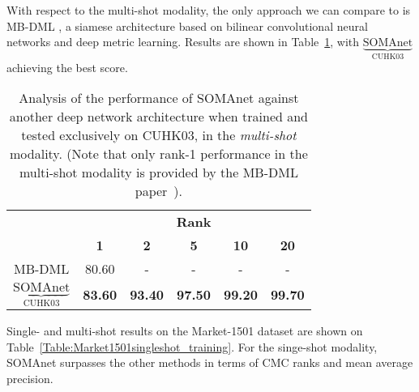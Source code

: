 \documentclass[10pt,journal,letterpaper,compsoc]{IEEEtran}
\newcommand{\ts}[2]{$\underbrace{\text{#1}}_\text{#2}$}
\begin{document}

With respect to the multi-shot modality, the only approach we can compare to is MB-DML \cite{mbdml,Lin_2015_ICCV}, a siamese architecture based on bilinear convolutional neural networks and deep metric learning. Results are shown in Table~\ref{Table:CUHK03multishot_training}, with \ts{SOMAnet}{CUHK03} achieving the best score.

\begin{table}[htbp]
\scriptsize
	\centering
	\caption{Analysis of the performance of SOMAnet against another deep network architecture when trained and tested exclusively on CUHK03, in the \emph{multi-shot} modality. (Note that only rank-1 performance in the multi-shot modality is provided by the MB-DML paper~\cite{mbdml}).}
	\begin{tabular}{cccccc}
		\toprule
		\multirow{ 2}{*}{\textbf{}} & \multicolumn{5}{c}{\textbf{Rank}} \\
		\cmidrule(r){2-6}
		 & \textbf{1} & \textbf{2}& \textbf{5} & \textbf{10} & \textbf{20} \\
		\midrule
        MB-DML \cite{mbdml} & 80.60   & -   & -   & -   & -       \\
        \ts{SOMAnet}{CUHK03}    & \textbf{83.60}   & \textbf{93.40}   & \textbf{97.50}   & \textbf{99.20}   & \textbf{99.70}   \\
    \bottomrule
    \end{tabular} \label{Table:CUHK03multishot_training}
\end{table}



Single- and multi-shot results on the Market-1501 dataset are shown on Table~\ref{Table:Market1501singleshot_training}. For the singe-shot modality, SOMAnet surpasses the other methods in terms of CMC ranks and mean average precision.
\end{document}
